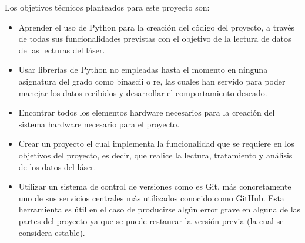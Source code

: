 Los objetivos técnicos planteados para este proyecto son:
\begin{itemize}
	\item Aprender el uso de Python para la creación del código del proyecto, a través de todas sus funcionalidades previstas con el objetivo de la lectura de datos de las lecturas del láser.
	\item Usar librerías de Python no empleadas hasta el momento en ninguna asignatura del grado como binascii o re, las cuales han servido para poder manejar los datos recibidos y desarrollar el comportamiento deseado.
	\item Encontrar todos los elementos hardware necesarios para la creación del sistema hardware necesario para el proyecto.
	\item Crear un proyecto el cual implementa la funcionalidad que se requiere en los objetivos del proyecto, es decir, que realice la lectura, tratamiento y análisis de los datos del láser.
	\item Utilizar un sistema de control de versiones como es Git, más concretamente uno de sus servicios centrales más utilizados conocido como GitHub. Esta herramienta es útil en el caso de producirse algún error grave en alguna de las partes del proyecto ya que se puede restaurar la versión previa (la cual se considera estable).
\end{itemize}


